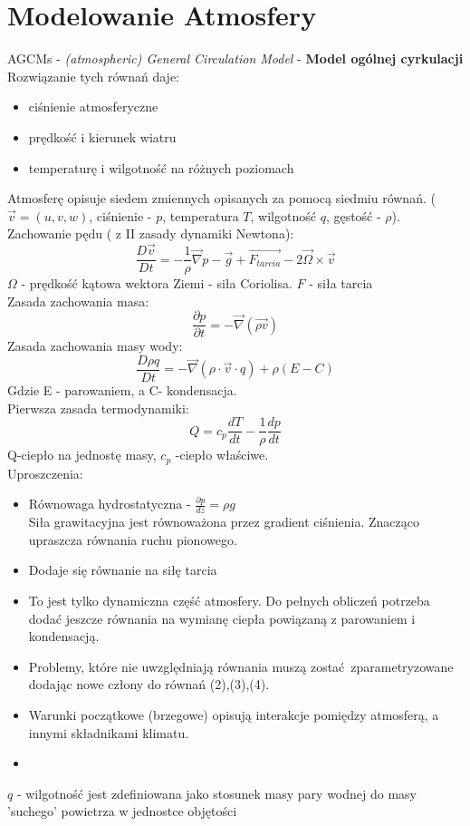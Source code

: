 \documentclass{article}
\theoremstyle{plain}
\begin{document}
\section{Modelowanie Atmosfery}
AGCMs - \textit{(atmospheric) General Circulation Model} - \textbf{Model ogólnej cyrkulacji}
	Rozwiązanie tych równań daje:
	\begin{itemize}
		\item ciśnienie atmosferyczne
		\item prędkość i kierunek wiatru
		\item temperaturę i wilgotność na różnych poziomach
	\end{itemize}
	Atmosferę opisuje siedem zmiennych opisanych za pomocą siedmiu równań. ($\overrightarrow{v} = (u,v,w)$, ciśnienie - $p$, temperatura $T$, wilgotność $q$, gęstość - $\rho$).\\
	Zachowanie pędu ( z II zasady dynamiki Newtona):
	\begin{equation}
		\frac{D\overrightarrow{v}}{Dt} = -\frac{1}{\rho}\overrightarrow\nabla p - \overrightarrow{g} + \overrightarrow{F_{tarcia}} - 2\overrightarrow{\Omega}\times\overrightarrow{v}
	\end{equation}
	$\Omega$ - prędkość kątowa wektora Ziemi - siła Coriolisa. $F$ - siła tarcia\\
	Zasada zachowania masa:
	\begin{equation}
		\frac{\partial p}{\partial t} = -\overrightarrow{\nabla}(\overrightarrow{\rho v})
	\end{equation}
Zasada zachowania masy wody:
\begin{equation}
	\frac{D\rho q}{Dt} = -\vec{\nabla}(\rho\cdot\vec{v}\cdot q)+\rho(E-C)
\end{equation}
Gdzie E - parowaniem, a C- kondensacja.\\
Pierwsza zasada termodynamiki:
\begin{equation}
	Q = c_p\frac{dT}{dt} - \frac{1}{\rho}\frac{dp}{dt}
\end{equation}
Q-ciepło na jednostę masy, $c_p$ -ciepło właściwe.\\
Uproszczenia:
\begin{itemize}
	\item Równowaga hydrostatyczna - $\frac{\partial p}{dz} = \rho g$\\ Siła grawitacyjna jest równoważona przez gradient ciśnienia. Znacząco upraszcza równania ruchu pionowego.
	\item Dodaje się równanie na siłę tarcia
	\item To jest tylko dynamiczna część atmosfery. Do pełnych obliczeń potrzeba dodać jeszcze równania na wymianę ciepła powiązaną z parowaniem i kondensacją.
	\item Problemy, które nie uwzględniają równania muszą zostać zparametryzowane dodając nowe człony do równań (2),(3),(4).
	\item Warunki początkowe (brzegowe) opisują interakcje pomiędzy atmosferą, a innymi składnikami klimatu.
	\item \end{itemize}
$q$ - wilgotność jest zdefiniowana jako stosunek masy pary wodnej do masy 'suchego' powietrza w jednostce objętości
\end{document}
